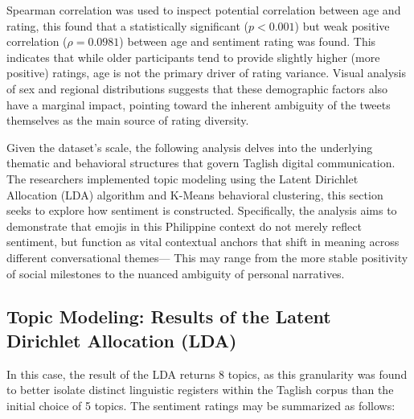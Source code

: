 Spearman correlation was used to inspect potential correlation between age and rating, this found that a statistically significant ($p < 0.001$) but weak positive correlation ($\rho = 0.0981$) between age and sentiment rating was found. This indicates that while older participants tend to provide slightly higher (more positive) ratings, age is not the primary driver of rating variance. Visual analysis of sex and regional distributions suggests that these demographic factors also have a marginal impact, pointing toward the inherent ambiguity of the tweets themselves as the main source of rating diversity.

Given the dataset’s scale, the following analysis delves into the underlying thematic and behavioral structures that govern Taglish digital communication. The researchers implemented topic modeling using the Latent Dirichlet Allocation (LDA) algorithm and K-Means behavioral clustering, this section seeks to explore how sentiment is constructed. Specifically, the analysis aims to demonstrate that emojis in this Philippine context do not merely reflect sentiment, but function as vital contextual anchors that shift in meaning across different conversational themes— This may range from the more stable positivity of social milestones to the nuanced ambiguity of personal narratives.

\subsection{Topic Modeling: Results of the Latent Dirichlet Allocation (LDA)}

In this case, the result of the LDA returns 8 topics, as this granularity was found to better isolate distinct linguistic registers within the Taglish corpus than the initial choice of 5 topics. The sentiment ratings may be summarized as follows:

